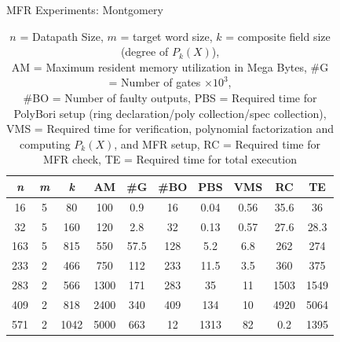 \begin{frame}{\large MFR Experiments: Montgomery}

{\scriptsize
\begin{table}[bht]
\centering
\caption*{{\scriptsize $\textit{n}$ = Datapath Size, $\textit{m}$ = target word size, 
$\textit{k}$ = composite field size (degree of $P_k(X)$), 
\\AM = Maximum resident memory utilization in Mega Bytes,
\#G = Number of gates $\times 10^3$, \\ \#BO = Number of faulty outputs, 
PBS = Required time for PolyBori setup (ring declaration/poly collection/spec collection),
VMS = Required time for verification, polynomial factorization and computing $P_k(X)$, and MFR setup, 
RC = Required time for MFR check, TE = Required time for total execution}}
\label{montvsspec}
\begin{tabular}{| c | c | c | c | c | c | c | c | c | c |} \hline
{\textit{\textbf{n}}} & {\textit{\textbf{m}}} & {\textit{\textbf{k}}} & {\textbf{AM}} & {\textbf{\#G}} 
& {\textbf{\#BO}} & {\textbf{PBS}} & {\textbf{VMS}} & {\textbf{RC}} & {\textbf{TE}} \\ \hline 
16  & 5 & 80   & 100 & 0.9  & 16  & 0.04 & 0.56 & 35.6     & 36   \\ \hline
32  & 5 & 160  & 120 & 2.8  & 32  & 0.13 & 0.57 & 27.6     & 28.3 \\ \hline
163 & 5 & 815  & 550 & 57.5 & 128 & 5.2  & 6.8  & 262      & 274  \\ \hline
233 & 2 & 466  & 750 & 112  & 233 & 11.5 & 3.5  & 360      & 375  \\ \hline
283 & 2 & 566  & 1300& 171  & 283 & 35   & 11   & 1503     & 1549 \\ \hline
\rowcolor{red}409 & 2 & 818  & 2400& 340  & 409 & 134  & 10   & 4920 & 5064 \\ \hline
\rowcolor{green}571 & 2 & 1042 & 5000& 663  &  12 & 1313 & 82   & 0.2 & 1395 \\ \hline
\end{tabular}
\end{table}}

\end{frame}


